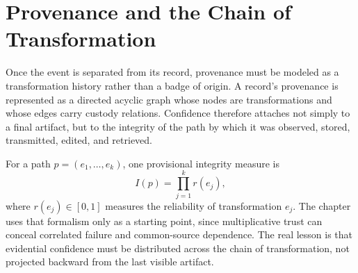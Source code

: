 
\chapter{Provenance and the Chain of Transformation}
\label{ch:ch007}


Once the event is separated from its record, provenance must be modeled as a transformation history rather than a badge of origin. A record's provenance is represented as a directed acyclic graph whose nodes are transformations and whose edges carry custody relations. Confidence therefore attaches not simply to a final artifact, but to the integrity of the path by which it was observed, stored, transmitted, edited, and retrieved.

For a path \(p=(e_1,\ldots,e_k)\), one provisional integrity measure is
\[
I(p)=\prod_{j=1}^{k}r(e_j),
\]
where \(r(e_j)\in[0,1]\) measures the reliability of transformation \(e_j\). The chapter uses that formalism only as a starting point, since multiplicative trust can conceal correlated failure and common-source dependence. The real lesson is that evidential confidence must be distributed across the chain of transformation, not projected backward from the last visible artifact.
